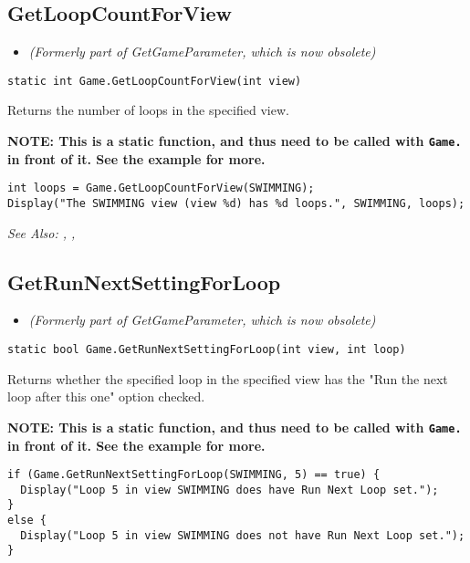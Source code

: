 \subsection{GetLoopCountForView}\label{Game.GetLoopCountForView}%

\begin{itemize}
\item \it{(Formerly part of GetGameParameter, which is now obsolete)}
\end{itemize}

\begin{verbatim}
static int Game.GetLoopCountForView(int view)
\end{verbatim}
Returns the number of loops in the specified view.

\bf{NOTE:} This is a static function, and thus need to be called with \verb$Game.$ in front of it. See
the example for more.

\begin{verbatim}
int loops = Game.GetLoopCountForView(SWIMMING);
Display("The SWIMMING view (view %d) has %d loops.", SWIMMING, loops);
\end{verbatim}

\it{See Also:} ,
,


\subsection{GetRunNextSettingForLoop}\label{Game.GetRunNextSettingForLoop}%

\begin{itemize}
\item \it{(Formerly part of GetGameParameter, which is now obsolete)}
\end{itemize}

\begin{verbatim}
static bool Game.GetRunNextSettingForLoop(int view, int loop)
\end{verbatim}
Returns whether the specified loop in the specified view has the "Run the next loop after this one" option checked.

\bf{NOTE:} This is a static function, and thus need to be called with \verb$Game.$ in front of it. See
the example for more.

\begin{verbatim}
if (Game.GetRunNextSettingForLoop(SWIMMING, 5) == true) {
  Display("Loop 5 in view SWIMMING does have Run Next Loop set.");
}
else {
  Display("Loop 5 in view SWIMMING does not have Run Next Loop set.");
}
\end{verbatim}

